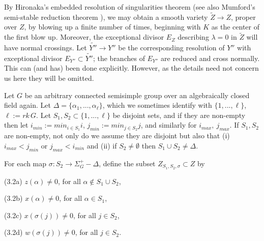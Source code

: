 \documentclass[12pt,letterpaper]{amsart}
\begin{document}
By Hironaka's embedded resolution of
singularities theorem (see also Mumford's semi-stable reduction theorem
\cite{Ke72}), we may obtain a smooth variety
$\tilde{Z}\rightarrow Z$, proper over $Z$, by blowing
up a finite number of times, beginning with $K$
as the center of the first blow up. Moreover, the exceptional
divisor $E_Z$ describing $\lambda =0$ in
$\tilde{Z}$ will have normal crossings.
Let $\tilde{Y''}\rightarrow Y''$ be the
corresponding resolution of $Y''$ with exceptional divisor
$E_{Y''}\subset \tilde{Y''}$; the branches of $E_{Y''}$ are reduced and
cross normally. This can (and has) been done explicitly.
However, as the details need not concern us here they will be omitted.

Let $G$ be an arbitrary connected semisimple
group over an algebraically closed field again.
Let $\Delta=\{\alpha_1,...,\alpha_\ell\}$, which we sometimes identify
with $\{1,...,\ell\}$, $\ell :=rk\, G$. Let $S_1,S_2\subset \{1,...,\ell\}$
be disjoint sets, and if they are
non-empty then let $i_{min}:=min_{i\in S_1}i$,
$j_{min}:=min_{j\in S_2}j$, and similarly for $i_{max},\ j_{max}$. If
$S_1,S_2$ are non-empty, not only do we assume
they are disjoint but also that
(i) $i_{max}<j_{min}$ or $j_{max}<i_{min}$
and (ii) if $S_2\not=\emptyset$ then
$S_1\cup S_2\not=\Delta$.

For each map $\sigma :S_2 \rightarrow \Sigma_G^+ -\Delta$,
define the subset $Z_{S_1,S_2,\sigma}\subset Z$ by

\noindent
(3.2a) $z(\alpha)\not= 0$, for all
$\alpha\notin S_1\cup S_2$,

\noindent
(3.2b) $x(\alpha)\not= 0$, for all $\alpha\in S_1$,

\noindent
(3.2c) $x(\sigma(j))\not= 0$, for all $j\in S_2$,

\noindent
(3.2d) $w(\sigma(j))\not= 0$, for all $j\in S_2$.
\end{document}
